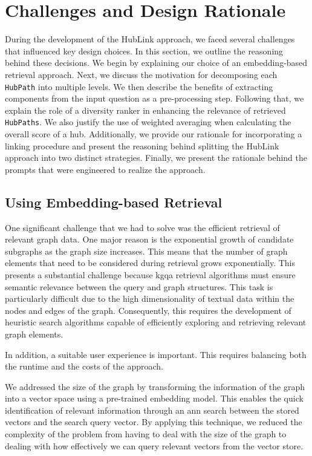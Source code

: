 
\section{Challenges and Design Rationale}
\label{sec:hublink_design_rationale}

During the development of the HubLink approach, we faced several challenges that influenced key design choices. In this section, we outline the reasoning behind these decisions. We begin by explaining our choice of an embedding-based retrieval approach. Next, we discuss the motivation for decomposing each \texttt{HubPath} into multiple levels. We then describe the benefits of extracting components from the input question as a pre-processing step. Following that, we explain the role of a diversity ranker in enhancing the relevance of retrieved \texttt{HubPaths}. We also justify the use of weighted averaging when calculating the overall score of a hub. Additionally, we provide our rationale for incorporating a linking procedure and present the reasoning behind splitting the HubLink approach into two distinct strategies. Finally, we present the rationale behind the prompts that were engineered to realize the approach.

\subsection{Using Embedding-based Retrieval}

One significant challenge that we had to solve was the efficient retrieval of relevant graph data. One major reason is the exponential growth of candidate subgraphs as the graph size increases. This means that the number of graph elements that need to be considered during retrieval grows exponentially. This presents a substantial challenge because \gls{kgqa} retrieval algorithms must ensure semantic relevance between the query and graph structures. This task is particularly difficult due to the high dimensionality of textual data within the nodes and edges of the graph. Consequently, this requires the development of heuristic search algorithms capable of efficiently exploring and retrieving relevant graph elements. \cite{peng_graph_2024,hu_grag_2024} 

In addition, a suitable user experience is important. This requires balancing both the runtime and the costs of the approach. 

We addressed the size of the graph by transforming the information of the graph into a vector space using a pre-trained embedding model. This enables the quick identification of relevant information through an \gls{ann} search between the stored vectors and the search query vector. By applying this technique, we reduced the complexity of the problem from having to deal with the size of the graph to dealing with how effectively we can query relevant vectors from the vector store.


